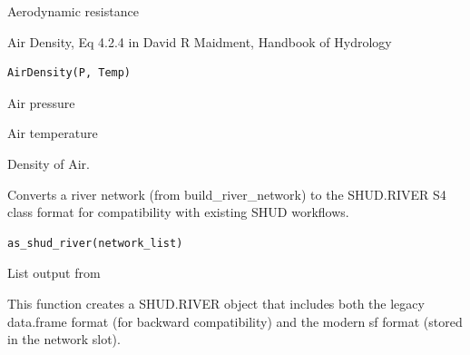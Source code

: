 \documentclass[a4paper]{book}
\begin{document}
%
\begin{Value}
Aerodynamic resistance 
\end{Value}
%
\begin{Description}\relax
Air Density, Eq 4.2.4 in David R Maidment, Handbook of Hydrology
\end{Description}
%
\begin{Usage}
\begin{verbatim}
AirDensity(P, Temp)
\end{verbatim}
\end{Usage}
%
\begin{Arguments}
\begin{ldescription}
\item[\code{P}] Air pressure 

\item[\code{Temp}] Air temperature 
\end{ldescription}
\end{Arguments}
%
\begin{Value}
Density of Air. 
\end{Value}
%
\begin{Description}\relax
Converts a river network (from build\_river\_network) to the SHUD.RIVER
S4 class format for compatibility with existing SHUD workflows.
\end{Description}
%
\begin{Usage}
\begin{verbatim}
as_shud_river(network_list)
\end{verbatim}
\end{Usage}
%
\begin{Arguments}
\begin{ldescription}
\item[\code{network\_list}] List output from 
\end{ldescription}
\end{Arguments}
%
\begin{Details}\relax
This function creates a SHUD.RIVER object that includes both the legacy
data.frame format (for backward compatibility) and the modern sf format
(stored in the network slot).
\end{Details}
\end{document}
